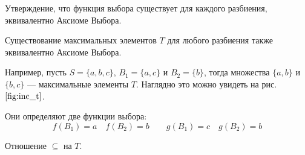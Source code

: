 Утверждение, что функция выбора существует для каждого разбиения,
эквивалентно Аксиоме Выбора.

Существование максимальных элементов $T$ для любого
разбиения также эквивалентно Аксиоме Выбора.

Например, пусть $S=\{a,b,c\}$, $B_1=\{a,c\}$ и $B_2=\{b\}$, тогда
множества $\{a,b\}$ и $\{b,c\}$ --- максимальные элементы $T$.
Наглядно это можно увидеть на рис. $\ref{fig:inc_t}$.

Они определяют две функции выбора:
\[
	f(B_1)=a\quad f(B_2)=b\qquad g(B_1)=c\quad g(B_2)=b
\]

\begin{marginfigure}
	\center

	\caption{Отношение $\subseteq$ на $T$.}\label{fig:inc_t}
\end{marginfigure}

